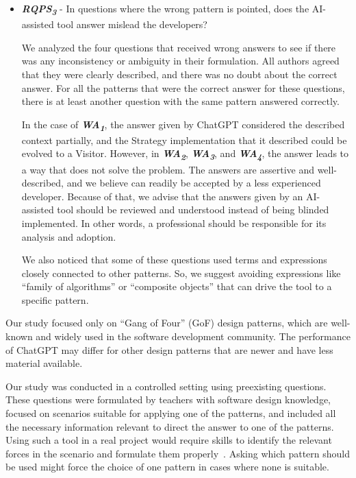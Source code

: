 \begin{itemize}
    \item  \textbf{\textit{RQPS\textsubscript{3}}} - In questions where the wrong pattern is pointed, does the AI-assisted tool answer mislead the developers?\label{sec5sub3}

    We analyzed the four questions that received wrong answers to see if there was any inconsistency or ambiguity in their formulation. All authors agreed that they were clearly described, and there was no doubt about the correct answer. For all the patterns that were the correct answer for these questions, there is at least another question with the same pattern answered correctly.

    In the case of \textbf{\textit{WA\textsubscript{1}}}, the answer given by ChatGPT considered the described context partially, and the Strategy implementation that it described could be evolved to a Visitor. However, in \textbf{\textit{WA\textsubscript{2}}}, \textbf{\textit{WA\textsubscript{3}}}, and \textbf{\textit{WA\textsubscript{4}}}, the answer leads to a way that does not solve the problem. The answers are assertive and well-described, and we believe can readily be accepted by a less experienced developer. Because of that, we advise that the answers given by an AI-assisted tool should be reviewed and understood instead of being blinded implemented. In other words, a professional should be responsible for its analysis and adoption.
    
    We also noticed that some of these questions used terms and expressions closely connected to other patterns. So, we suggest avoiding expressions like ``family of algorithms'' or ``composite objects'' that can drive the tool to a specific pattern.
    
\end{itemize}

\label{sec5sub4}

Our study focused only on ``Gang of Four'' (GoF) design patterns, which are well-known and widely used in the software development community. The performance of ChatGPT may differ for other design patterns that are newer and have less material available.

Our study was conducted in a controlled setting using preexisting questions. These questions were formulated by teachers with software design knowledge, focused on scenarios suitable for applying one of the patterns, and included all the necessary information relevant to direct the answer to one of the patterns. Using such a tool in a real project would require skills to identify the relevant forces in the scenario and formulate them properly~\cite{White2023}. Asking which pattern should be used might force the choice of one pattern in cases where none is suitable.

